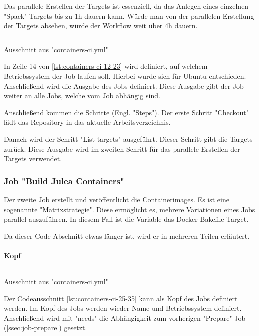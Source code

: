 Das parallele Erstellen der Targets ist essenziell, da das Anlegen eines einzelnen "Spack"-Targets bis zu 1h dauern kann. Würde man von der parallelen Erstellung der Targets absehen, würde der Workflow weit über 4h dauern.

\begin{listing}[H]
    \inputminted[firstline=12,lastline=23]{yaml}{./code-examples/containers-ci.yml}
    \caption{Ausschnitt aus "containers-ci.yml"}
    \label{lst:containers-ci-12-23}
\end{listing}

In Zeile 14 von \cref{lst:containers-ci-12-23} wird definiert, auf welchem Betriebssystem der Job laufen soll. Hierbei wurde sich für Ubuntu entschieden. 
Anschließend wird die Ausgabe des Jobs definiert. Diese Ausgabe gibt der Job weiter an alle Jobs, welche vom Job abhängig sind.

Anschließend kommen die Schritte (Engl. "Steps"). Der erste Schritt "Checkout" lädt das Repository in das aktuelle Arbeitsverzeichnis.

Danach wird der Schritt "List targets" ausgeführt. Dieser Schritt gibt die Targets zurück. Diese Ausgabe wird im zweiten Schritt für das parallele Erstellen der Targets verwendet.

\subsubsection{Job "Build Julea Containers"}

Der zweite Job erstellt und veröffentlicht die Containerimages. Es ist eine sogenannte "Matrixstrategie". Diese ermöglicht es, mehrere Variationen eines Jobs parallel auszuführen. In diesem Fall ist die Variable das Docker-Bakefile-Target.

Da dieser Code-Abschnitt etwas länger ist, wird er in mehreren Teilen erläutert.

\paragraph{Kopf}

\begin{listing}[H]
    \inputminted[firstline=25,lastline=35]{yaml}{./code-examples/containers-ci.yml}
    \caption{Ausschnitt aus "containers-ci.yml"}
    \label{lst:containers-ci-25-35}
\end{listing}

Der Codeausschnitt \cref{lst:containers-ci-25-35} kann als Kopf des Jobs definiert werden. Im Kopf des Jobs werden wieder Name und Betriebssystem definiert. Anschließend wird mit "needs" die Abhängigkeit zum vorherigen "Prepare"-Job (\cref{ssec:job-prepare}) gesetzt. 

